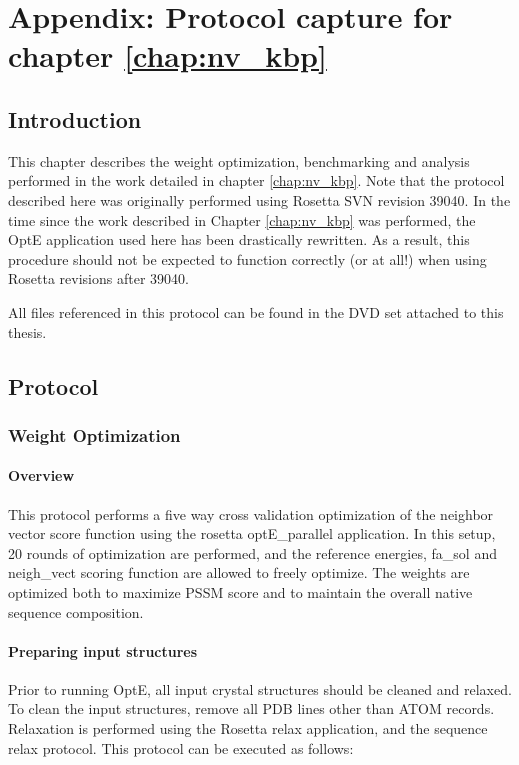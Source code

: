 \chapter{Appendix: Protocol capture for chapter \ref{chap:nv_kbp}}

\section{Introduction}

This chapter describes the weight optimization, benchmarking and analysis performed in the work detailed in chapter \ref{chap:nv_kbp}.
Note that the protocol described here was originally performed using Rosetta SVN revision 39040.
In the time since the work described in Chapter \ref{chap:nv_kbp} was performed, the OptE application used here has been drastically rewritten.
As a result, this procedure should not be expected to function correctly (or at all!) when using Rosetta revisions after 39040.

All files referenced in this protocol can be found in the DVD set attached to this thesis. 

\section{Protocol}

\subsection{Weight Optimization}
\label{subsec:nv_weight_opt}
\subsubsection{Overview}
This protocol performs a five way cross validation optimization of the neighbor vector score function using the rosetta optE\_parallel application.
In this setup, 20 rounds of optimization are performed, and the reference energies, fa\_sol and neigh\_vect scoring function are allowed to freely optimize.
The weights are optimized both to maximize PSSM score and to maintain the overall native sequence composition.

\subsubsection{Preparing input structures}
\label{subsubsec:nv_input_prep}
Prior to running OptE, all input crystal structures should be cleaned and relaxed.
To clean the input structures, remove all PDB lines other than ATOM records.
Relaxation is performed using the Rosetta relax application, and the sequence relax protocol.
This protocol can be executed as follows:

